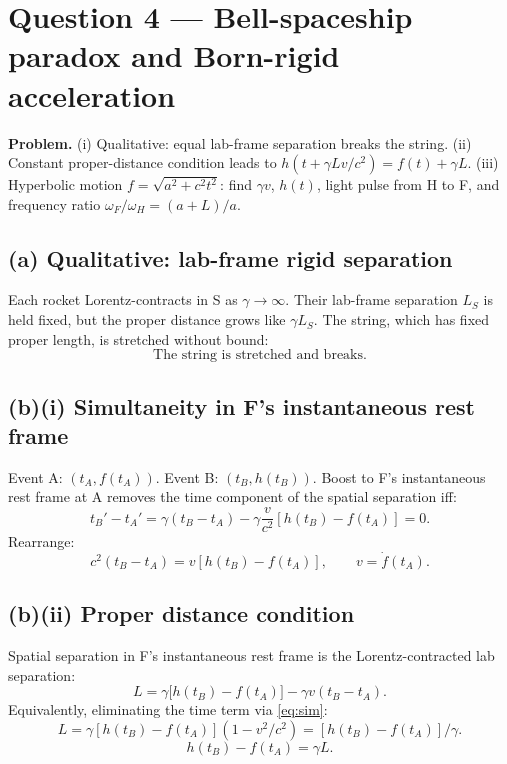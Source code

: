 \documentclass[11pt]{article}
\begin{document}
\section*{Question 4 --- Bell-spaceship paradox and Born-rigid acceleration}

\textbf{Problem.} (i) Qualitative: equal lab-frame separation breaks the string. (ii) Constant proper-distance condition leads to $h(t+\gamma Lv/c^2)=f(t)+\gamma L$. (iii) Hyperbolic motion $f=\sqrt{a^2+c^2t^2}$: find $\gamma v$, $h(t)$, light pulse from H to F, and frequency ratio $\omega_F/\omega_H=(a+L)/a$.

\subsection*{(a) Qualitative: lab-frame rigid separation}

Each rocket Lorentz-contracts in S as $\gamma\to\infty$. Their lab-frame separation $L_S$ is held fixed, but the proper distance grows like $\gamma L_S$. The string, which has fixed proper length, is stretched without bound:
\begin{equation}
\boxed{\;\text{The string is stretched and breaks.}\;}
\end{equation}

\subsection*{(b)(i) Simultaneity in F's instantaneous rest frame}

Event A: $(t_A, f(t_A))$. Event B: $(t_B, h(t_B))$. Boost to F's instantaneous rest frame at A removes the time component of the spatial separation iff:
\[ t_B' - t_A' = \gamma(t_B-t_A) - \gamma\frac{v}{c^2}[h(t_B)-f(t_A)] = 0. \]
Rearrange:
\begin{equation}
\boxed{\;c^2(t_B-t_A) = v[h(t_B)-f(t_A)],\qquad v=\dot f(t_A).\;}
\label{eq:sim}
\end{equation}

\subsection*{(b)(ii) Proper distance condition}

Spatial separation in F's instantaneous rest frame is the Lorentz-contracted lab separation:
\begin{equation}
\boxed{\;L = \gamma\bigl[h(t_B)-f(t_A)\bigr] - \gamma v(t_B-t_A).\;}
\label{eq:propsep}
\end{equation}
Equivalently, eliminating the time term via \eqref{eq:sim}:
\[ L = \gamma[h(t_B)-f(t_A)](1-v^2/c^2) = [h(t_B)-f(t_A)]/\gamma. \]
\begin{equation}
\boxed{\;h(t_B) - f(t_A) = \gamma L.\;}
\label{eq:propL}
\end{equation}
\end{document}
